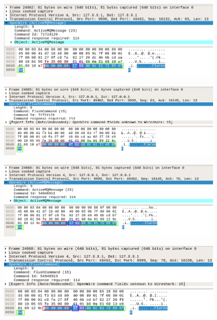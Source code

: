 \documentclass[12pt]{article}
\begin{document}
\begin{figure}[H]
  \centering
  \includegraphics[width=\textwidth]{18}
  \caption{}
\end{figure}

\begin{figure}[H]
  \centering
  \includegraphics[width=\textwidth]{19}
  \caption{}
\end{figure}

\begin{figure}[H]
  \centering
  \includegraphics[width=\textwidth]{20}
  \caption{}
\end{figure}

\begin{figure}[H]
  \centering
  \includegraphics[width=\textwidth]{21}
  \caption{}
\end{figure}
\end{document}
